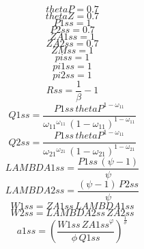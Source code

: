 \begin{dmath*}
thetaP = 0.7
\end{dmath*}
\begin{dmath*}
thetaZ = 0.7
\end{dmath*}
\begin{dmath*}
P1ss = 1
\end{dmath*}
\begin{dmath*}
P2ss = 0.7
\end{dmath*}
\begin{dmath*}
ZA1ss = 1
\end{dmath*}
\begin{dmath*}
ZA2ss = 0.7
\end{dmath*}
\begin{dmath*}
ZMss = 1
\end{dmath*}
\begin{dmath*}
piss = 1
\end{dmath*}
\begin{dmath*}
pi1ss = 1
\end{dmath*}
\begin{dmath*}
pi2ss = 1
\end{dmath*}
\begin{dmath*}
Rss = \frac{1}{{{\beta}}}-1
\end{dmath*}
\begin{dmath*}
Q1ss = \frac{{P1ss}\, {thetaP}^{1-{{\omega_{11}}}}}{{{\omega_{11}}}^{{{\omega_{11}}}}\, \left(1-{{\omega_{11}}}\right)^{1-{{\omega_{11}}}}}
\end{dmath*}
\begin{dmath*}
Q2ss = \frac{{P1ss}\, {thetaP}^{1-{{\omega_{11}}}}}{{{\omega_{21}}}^{{{\omega_{21}}}}\, \left(1-{{\omega_{21}}}\right)^{1-{{\omega_{21}}}}}
\end{dmath*}
\begin{dmath*}
LAMBDA1ss = \frac{{P1ss}\, \left({{\psi}}-1\right)}{{{\psi}}}
\end{dmath*}
\begin{dmath*}
LAMBDA2ss = \frac{\left({{\psi}}-1\right)\, {P2ss}}{{{\psi}}}
\end{dmath*}
\begin{dmath*}
W1ss = {ZA1ss}\, {LAMBDA1ss}
\end{dmath*}
\begin{dmath*}
W2ss = {LAMBDA2ss}\, {ZA2ss}
\end{dmath*}
\begin{dmath*}
a1ss = \left(\frac{{W1ss}\, {ZA1ss}^{{{\varphi}}}}{{{\phi}}\, {Q1ss}}\right)^{\frac{1}{{{\sigma}}}}
\end{dmath*}
